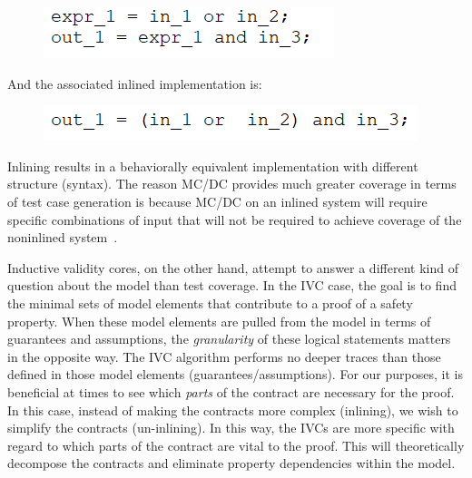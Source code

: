 \begin{figure}[h]
	\begin{center}
		\includegraphics[scale=1.0]{images/uninlinedEx.PNG}
	\end{center}
	\vspace{-1.5em}
\end{figure}

And the associated inlined implementation is: 

\begin{figure}[h]
	\begin{center}
		\includegraphics[scale=1.0]{images/inlined.PNG}
	\end{center}
	\vspace{-1.5em}
\end{figure}

Inlining results in a behaviorally equivalent implementation with different structure (syntax). The reason MC/DC provides much greater coverage in terms of test case generation is because MC/DC on an inlined system will require specific combinations of input that will not be required to achieve coverage of the noninlined system~\cite{gay2016effect}. 

Inductive validity cores, on the other hand, attempt to answer a different kind of question about the model than test coverage. In the IVC case, the goal is to find the minimal sets of model elements that contribute to a proof of a safety property. When these model elements are pulled from the model in terms of guarantees and assumptions, the \emph{granularity} of these logical statements matters in the opposite way. The IVC algorithm performs no deeper traces than those defined in those model elements (guarantees/assumptions). For our purposes, it is beneficial at times to see which \emph{parts} of the contract are necessary for the proof. In this case, instead of making the contracts more complex (inlining), we wish to simplify the contracts (un-inlining). In this way, the IVCs are more specific with regard to which parts of the contract are vital to the proof. This will theoretically decompose the contracts and eliminate property dependencies within the model. 

